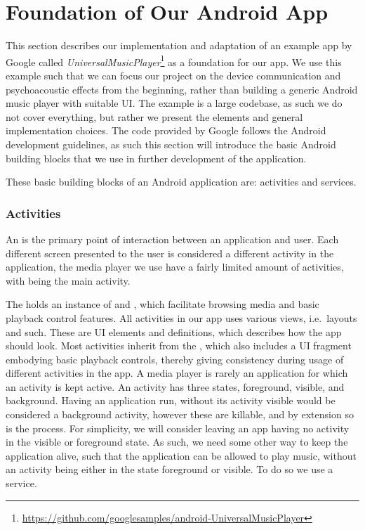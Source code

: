 \section{Foundation of Our Android App}\label{sec:foundation_of_our_android_app}
This section describes our implementation and adaptation of an example app by Google called \textit{UniversalMusicPlayer}\footnote{\url{https://github.com/googlesamples/android-UniversalMusicPlayer}} as a foundation for our app.
We use this example such that we can focus our project on the device communication and psychoacoustic effects from the beginning, rather than building a generic Android music player with suitable \ac{UI}.
The example is a large codebase, as such we do not cover everything, but rather we present the elements and general implementation choices.
The code provided by Google follows the Android development guidelines, as such this section will introduce the basic Android building blocks that we use in further development of the application.

These basic building blocks of an Android application are: activities and services.

\subsubsection{Activities}\label{subsec:activities}
An  is the primary point of interaction between an application and user.
Each different screen presented to the user is considered a different activity in the application, the media player we use have a fairly limited amount of activities, with  being the main activity.

The  holds an instance of  and , which facilitate browsing media and basic playback control features.
All activities in our app uses various views, i.e.~layouts and such. These are \ac{UI} elements and definitions, which describes how the app should look.
Most activities inherit from the , which also includes a \ac{UI} fragment embodying basic playback controls, thereby giving consistency during usage of different activities in the app.
A media player is rarely an application for which an activity is kept active.
An activity has three states, foreground, visible, and background.
Having an application run, without its activity visible would be considered a background activity, however these are killable, and by extension so is the process.
For simplicity, we will consider leaving an app having no activity in the visible or foreground state.
As such, we need some other way to keep the application alive, such that the application can be allowed to play music, without an activity being either in the state foreground or visible.
To do so we use a service.


